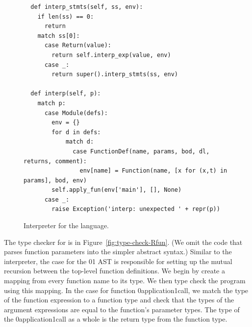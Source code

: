 \documentclass[7x10,nocrop]{TimesAPriori_MIT}%
\def\racketEd{0}
\def\pythonEd{1}
\def\edition{1}
\newcommand{\racket}[1]{{\if\edition\racketEd{#1}\fi}}
\newcommand{\python}[1]{{\if\edition\pythonEd #1\fi}}
\begin{document}
\begin{figure}[tp]
{\begin{lstlisting}
  def interp_stmts(self, ss, env):
    if len(ss) == 0:
      return
    match ss[0]:
      case Return(value):
        return self.interp_exp(value, env)
      case _:
        return super().interp_stmts(ss, env)
    
  def interp(self, p):
    match p:
      case Module(defs):
        env = {}
        for d in defs:
            match d:
              case FunctionDef(name, params, bod, dl, returns, comment):
                env[name] = Function(name, [x for (x,t) in params], bod, env)
        self.apply_fun(env['main'], [], None)
      case _:
        raise Exception('interp: unexpected ' + repr(p))
\end{lstlisting}
\fi}
\caption{Interpreter for the \LangFun{} language.}
\label{fig:interp-Rfun}
\end{figure}



The type checker for \LangFun{} is in
Figure~\ref{fig:type-check-Rfun}.  (We omit the code that parses
function parameters into the simpler abstract syntax.)  Similar to the
interpreter, the case for the
\racket{}\python{}
%
AST is responsible for setting up the mutual recursion between the
top-level function definitions. We begin by create a mapping
 from every function name to its type. We then type check
the program using this mapping.
%
In the case for function \racket{application}\python{call}, we match
the type of the function expression to a function type and check that
the types of the argument expressions are equal to the function's
parameter types. The type of the \racket{application}\python{call} as
a whole is the return type from the function type.
\end{document}
